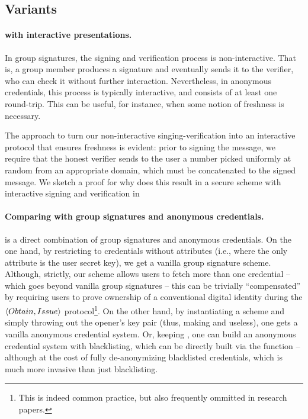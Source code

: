 \subsection{\GSAC Variants}
\label{ssec:variants-gsac}

\paragraph{\GSAC with interactive presentations.} %
In group signatures, the signing and verification process is non-interactive.
That is, a group member produces a signature and eventually sends it to the
verifier, who can check it without further interaction. Nevertheless, in
anonymous credentials, this process is typically interactive, and consists of
at least one round-trip. This can be useful, for instance, when some notion of
freshness is necessary.

The approach to turn our non-interactive singing-verification into an
interactive protocol that ensures freshness is evident: prior to signing the
message, we require that the honest verifier sends to the user a number picked
uniformly at random from an appropriate domain, which must be concatenated to
the signed message. We sketch a proof for why does this result in a secure
\GSAC scheme with interactive signing and verification in

\paragraph{Comparing \GSAC with group signatures and anonymous
  credentials.} %

\GSAC is a direct combination of group signatures and anonymous credentials.
%
On the one hand, by restricting to credentials without attributes (i.e., where
the only attribute is the user secret key), we get a vanilla group signature
scheme. Although, strictly, our scheme allows users to fetch more than one
credential -- which goes beyond vanilla group signatures -- this can be
trivially ``compensated'' by requiring users to prove ownership of a
conventional digital identity during the $\langle Obtain,Issue \rangle$
protocol\footnote{This is indeed common practice, but also frequently ommitted
  in research papers.}.
%
On the other hand, by instantiating a \GSAC scheme and simply
throwing out the opener's key pair (thus, making \Open and \Judge useless), one
gets a vanilla anonymous credential system. Or, keeping \osk, one can build an
anonymous credential system with blacklisting, which can be directly built via
the \Open function -- although at the cost of fully de-anonymizing blacklisted
credentials, which is much more invasive than just blacklisting.

